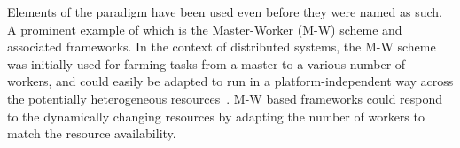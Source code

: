\documentclass{sig-alternate}
\begin{document}



Elements of the \pilotjob paradigm have been used even before they
were named as such. 
A prominent example of which is the Master-Worker (M-W) scheme and
associated frameworks. In the context of distributed systems, the M-W
scheme was initially used for farming tasks from a master to a various
number of workers, and could easily be adapted to run in a
platform-independent way across the potentially heterogeneous
resources~\cite{masterworker, Goux00anenabling}. M-W based
frameworks could respond to the dynamically changing resources by
adapting the number of workers to match the resource availability.
\end{document}

